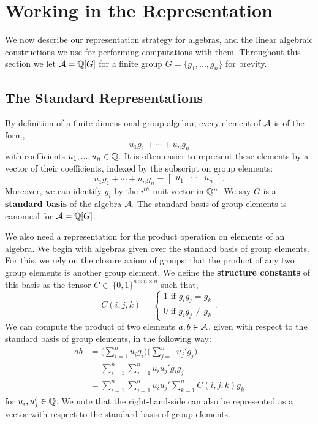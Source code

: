 \documentclass[../thesis.tex]{subfiles}
\begin{document}
\section{Working in the Representation}\label{sec:representations}
We now describe our representation strategy for algebras, and the linear algebraic constructions we use for performing computations with them. Throughout this section we let $\mathcal{A} = \mathbb{Q}[G]$ for a finite group $G =\{g_1,...,g_n\}$ for brevity.

\subsection{The Standard Representations}
By definition of a finite dimensional group algebra, every element of $\mathcal{A}$ is of the form,
\begin{equation*}
    u_1g_1+\cdots+u_ng_n
\end{equation*}
with coefficients $u_1,...,u_n\in\mathbb{Q}.$ It is often easier to represent these elements by a vector of their coefficients, indexed by the subscript on group elements:
\begin{equation*}
    u_1g_1+\cdots+u_ng_n = \begin{bmatrix}u_1 &\cdots & u_n\end{bmatrix}.
\end{equation*}
Moreover, we can identify $g_i$ by the $i^{th}$ unit vector in $\mathbb{Q}^n.$ We say $G$ is a \textbf{standard basis} of the algebra $\mathcal{A}.$ The standard basis of group elements is canonical for $\mathcal{A} = \mathbb{Q}[G]$.

We also need a representation for the product operation on elements of an algebra. We begin with algebras given over the standard basis of group elements. For this, we rely on the closure axiom of groups: that the product of any two group elements is another group element. We define the \textbf{structure constants} of this basis as the tensor $C\in\ \{0,1\}^{n\times n\times n}$ such that,
\begin{equation}\label{eq:GroupStructureConstants}
    C(i,j,k) = \begin{cases}
                    1 \text{ if } g_ig_j = g_k \\
                    0 \text{ if } g_ig_j \neq g_k
                \end{cases}.
\end{equation}
We can compute the product of two elements $a,b\in\mathcal{A}$, given with respect to the standard basis of group elements, in the following way:
\begin{align*}\label{eq:SCalgebraproduct}
    ab &= \Big(\sum_{i=1}^n u_ig_i\Big) \Big(\sum_{j=1}^n u_j'g_j\Big) \\
    &= \sum_{i=1}^n\sum_{j=1}^n u_iu_j'g_ig_j\\
    &= \sum_{i=1}^n\sum_{j=1}^n u_iu_j'\sum_{k=1}^n C(i,j,k) g_k
\end{align*}
for $u_i,u_j'\in\mathbb{Q}$. We note that the right-hand-side can also be represented as a vector with respect to the standard basis of group elements.
\end{document}
